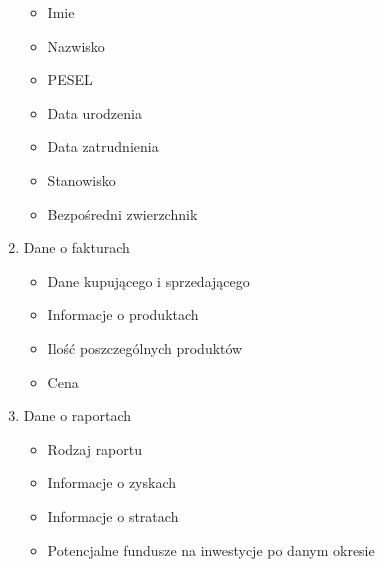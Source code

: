 \begin{enumerate}
\begin{itemize}
		\item Imie
		\item Nazwisko
		\item PESEL
		\item Data urodzenia
		\item Data zatrudnienia
		\item Stanowisko
		\item Bezpośredni zwierzchnik
	\end{itemize}
	\item Dane o fakturach 
	\begin{itemize}
		\item Dane kupującego i sprzedającego
		\item Informacje o produktach
		\item Ilość poszczególnych produktów
		\item Cena
	\end{itemize}
	\item Dane o raportach 
	\begin{itemize}
		\item Rodzaj raportu
		\item Informacje o zyskach
		\item Informacje o stratach
		\item Potencjalne fundusze na inwestycje po danym okresie
	\end{itemize}
\end{enumerate}